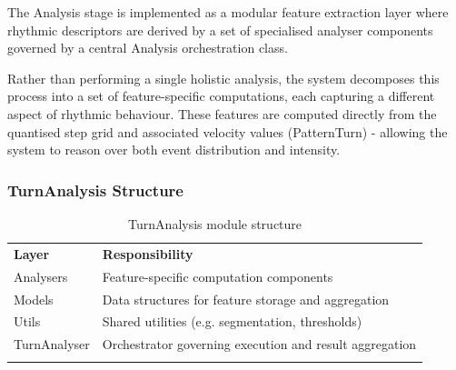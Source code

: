 The Analysis stage is implemented as a modular feature extraction layer
where rhythmic descriptors are derived by a set of specialised analyser
components governed by a central Analysis orchestration class.

Rather than performing a single holistic analysis, the system decomposes
this process into a set of feature-specific computations, each capturing
a different aspect of rhythmic behaviour. These features are computed
directly from the quantised step grid and associated velocity values
(PatternTurn) - allowing the system to reason over both event
distribution and intensity.

\subsubsection{TurnAnalysis Structure}\label{turnanalysis-structure}

\begin{longtable}[]{@{}
  >{\raggedright\arraybackslash}p{}
  >{\raggedright\arraybackslash}p{}@{}}
\caption{TurnAnalysis module structure}\label{tab:turnanalysis-structure}\\
\toprule\noalign{}
\begin{minipage}[b]{\linewidth}\centering
\textbf{Layer}
\end{minipage} & \begin{minipage}[b]{\linewidth}\centering
\textbf{Responsibility}
\end{minipage} \\
\begin{minipage}[b]{\linewidth}\raggedright
Analysers
\end{minipage} & \begin{minipage}[b]{\linewidth}\raggedright
Feature-specific computation components
\end{minipage} \\
\begin{minipage}[b]{\linewidth}\raggedright
Models
\end{minipage} & \begin{minipage}[b]{\linewidth}\raggedright
Data structures for feature storage and aggregation
\end{minipage} \\
\begin{minipage}[b]{\linewidth}\raggedright
Utils
\end{minipage} & \begin{minipage}[b]{\linewidth}\raggedright
Shared utilities (e.g. segmentation, thresholds)
\end{minipage} \\
\begin{minipage}[b]{\linewidth}\raggedright
TurnAnalyser
\end{minipage} & \begin{minipage}[b]{\linewidth}\raggedright
Orchestrator governing execution and result aggregation
\end{minipage} \\
\midrule\noalign{}
\endhead
\bottomrule\noalign{}
\endlastfoot
\end{longtable}


